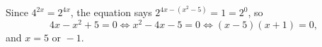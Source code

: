 Since $4^{2x}=2^{4x}$, the equation says $2^{4x-\left(x^2-5\right)}=1=2^0$, so
\[4x-x^2+5=0\iff x^2-4x-5=0\iff(x-5)(x+1)=0,\]
and $x=\boxed{5\text{ or }-1}$.
